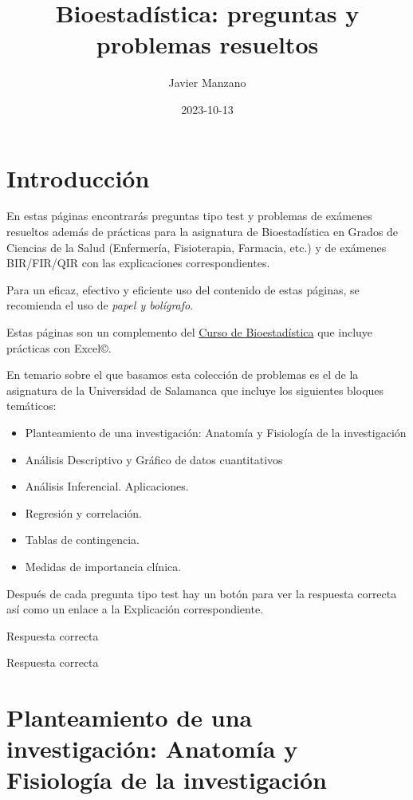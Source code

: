 \documentclass[
]{book}
\title{Bioestadística: preguntas y problemas resueltos}
\author{Javier Manzano}
\date{2023-10-13}
\begin{document}
\maketitle

{
\setcounter{tocdepth}{1}
\tableofcontents
}
\hypertarget{introducciuxf3n}{%
\chapter{Introducción}\label{introducciuxf3n}}

En estas páginas encontrarás preguntas tipo test y problemas de exámenes resueltos además de prácticas para la asignatura de Bioestadística en Grados de Ciencias de la Salud (Enfermería, Fisioterapia, Farmacia, etc.) y de exámenes BIR/FIR/QIR con las explicaciones correspondientes.

Para un eficaz, efectivo y eficiente uso del contenido de estas páginas, se recomienda el uso de \emph{papel y bolígrafo}.

Estas páginas son un complemento del \href{https://1fjmanzano.github.io/bioestadistica/}{Curso de Bioestadística} que incluye prácticas con Excel©.

En temario sobre el que basamos esta colección de problemas es el de la asignatura de la Universidad de Salamanca que incluye los siguientes bloques temáticos:

\begin{itemize}
\item
  Planteamiento de una investigación: Anatomía y Fisiología de la investigación
\item
  Análisis Descriptivo y Gráfico de datos cuantitativos
\item
  Análisis Inferencial. Aplicaciones.
\item
  Regresión y correlación.
\item
  Tablas de contingencia.
\item
  Medidas de importancia clínica.
\end{itemize}

Después de cada pregunta tipo test hay un botón para ver la respuesta correcta así como un enlace a la Explicación correspondiente.

Respuesta correcta

Respuesta correcta

\hypertarget{planteamiento-de-una-investigaciuxf3n-anatomuxeda-y-fisiologuxeda-de-la-investigaciuxf3n}{%
\chapter{Planteamiento de una investigación: Anatomía y Fisiología de la investigación}\label{planteamiento-de-una-investigaciuxf3n-anatomuxeda-y-fisiologuxeda-de-la-investigaciuxf3n}}
\end{document}
